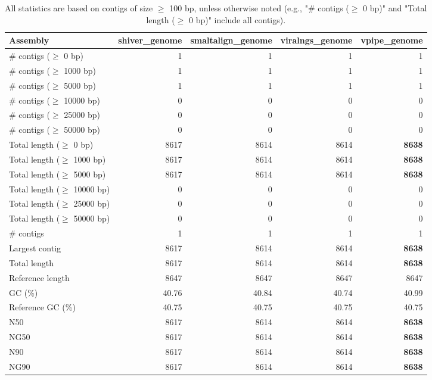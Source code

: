 \documentclass[12pt,a4paper]{article}
\begin{document}
\begin{table}[ht]
\begin{center}
\caption{All statistics are based on contigs of size $\geq$ 100 bp, unless otherwise noted (e.g., "\# contigs ($\geq$ 0 bp)" and "Total length ($\geq$ 0 bp)" include all contigs).}
\begin{tabular}{|l*{4}{|r}|}
\hline
Assembly & shiver\_genome & smaltalign\_genome & viralngs\_genome & vpipe\_genome \\ \hline
\# contigs ($\geq$ 0 bp) & 1 & 1 & 1 & 1 \\ \hline
\# contigs ($\geq$ 1000 bp) & 1 & 1 & 1 & 1 \\ \hline
\# contigs ($\geq$ 5000 bp) & 1 & 1 & 1 & 1 \\ \hline
\# contigs ($\geq$ 10000 bp) & 0 & 0 & 0 & 0 \\ \hline
\# contigs ($\geq$ 25000 bp) & 0 & 0 & 0 & 0 \\ \hline
\# contigs ($\geq$ 50000 bp) & 0 & 0 & 0 & 0 \\ \hline
Total length ($\geq$ 0 bp) & 8617 & 8614 & 8614 & {\bf 8638} \\ \hline
Total length ($\geq$ 1000 bp) & 8617 & 8614 & 8614 & {\bf 8638} \\ \hline
Total length ($\geq$ 5000 bp) & 8617 & 8614 & 8614 & {\bf 8638} \\ \hline
Total length ($\geq$ 10000 bp) & 0 & 0 & 0 & 0 \\ \hline
Total length ($\geq$ 25000 bp) & 0 & 0 & 0 & 0 \\ \hline
Total length ($\geq$ 50000 bp) & 0 & 0 & 0 & 0 \\ \hline
\# contigs & 1 & 1 & 1 & 1 \\ \hline
Largest contig & 8617 & 8614 & 8614 & {\bf 8638} \\ \hline
Total length & 8617 & 8614 & 8614 & {\bf 8638} \\ \hline
Reference length & 8647 & 8647 & 8647 & 8647 \\ \hline
GC (\%) & 40.76 & 40.84 & 40.74 & 40.99 \\ \hline
Reference GC (\%) & 40.75 & 40.75 & 40.75 & 40.75 \\ \hline
N50 & 8617 & 8614 & 8614 & {\bf 8638} \\ \hline
NG50 & 8617 & 8614 & 8614 & {\bf 8638} \\ \hline
N90 & 8617 & 8614 & 8614 & {\bf 8638} \\ \hline
NG90 & 8617 & 8614 & 8614 & {\bf 8638} \\ \hline

\end{tabular}
\end{center}
\end{table}
\end{document}
